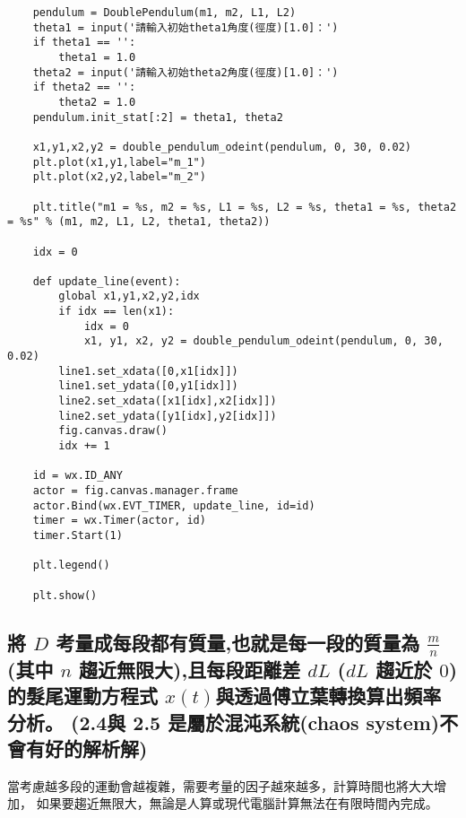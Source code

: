 \documentclass[UTF8,a4paper,12pt]{article}
\begin{document}
\begin{lstlisting}
    pendulum = DoublePendulum(m1, m2, L1, L2)
    theta1 = input('請輸入初始theta1角度(徑度)[1.0]：')
    if theta1 == '':
        theta1 = 1.0
    theta2 = input('請輸入初始theta2角度(徑度)[1.0]：')
    if theta2 == '':
        theta2 = 1.0
    pendulum.init_stat[:2] = theta1, theta2
    
    x1,y1,x2,y2 = double_pendulum_odeint(pendulum, 0, 30, 0.02)
    plt.plot(x1,y1,label="m_1")
    plt.plot(x2,y2,label="m_2")
    
    plt.title("m1 = %s, m2 = %s, L1 = %s, L2 = %s, theta1 = %s, theta2 = %s" % (m1, m2, L1, L2, theta1, theta2))
    
    idx = 0
    
    def update_line(event):
        global x1,y1,x2,y2,idx
        if idx == len(x1):
            idx = 0
            x1, y1, x2, y2 = double_pendulum_odeint(pendulum, 0, 30, 0.02)
        line1.set_xdata([0,x1[idx]])
        line1.set_ydata([0,y1[idx]])
        line2.set_xdata([x1[idx],x2[idx]])
        line2.set_ydata([y1[idx],y2[idx]])
        fig.canvas.draw()
        idx += 1
    
    id = wx.ID_ANY
    actor = fig.canvas.manager.frame
    actor.Bind(wx.EVT_TIMER, update_line, id=id)
    timer = wx.Timer(actor, id)
    timer.Start(1)
    
    plt.legend()
    
    plt.show()
\end{lstlisting}


\subsection{將 \texorpdfstring{$D$}{D} 考量成每段都有質量,也就是每一段的質量為 
\texorpdfstring{$\frac{m}{n}$}{m/n}
(其中 \texorpdfstring{$n$}{n} 趨近無限大),且每段距離差 \texorpdfstring{$dL$}{dL} 
(\texorpdfstring{$dL$}{dL} 趨近於 \texorpdfstring{$0$}{0})的髮尾運動方程式 
\texorpdfstring{$x(t)$}{x(t)}與透過傅立葉轉換算出頻率分析。
(2.4與 2.5 是屬於混沌系統(chaos system)不會有好的解析解)}

當考慮越多段的運動會越複雜，需要考量的因子越來越多，計算時間也將大大增加，
如果要趨近無限大，無論是人算或現代電腦計算無法在有限時間內完成。
\end{document}
